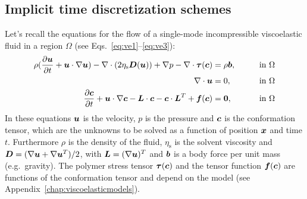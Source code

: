 \subsection{Implicit time discretization schemes}
\label{sec:implicitschemes}

Let's recall the equations for the flow of a single-mode incompressible viscoelastic fluid
in a region $\Omega$ (see Eqs.~\eqref{eq:ve1}--\eqref{eq:ve3}):
\begin{alignat}{2}
  \rho(\dfrac{\partial \boldsymbol{u}}{\partial t}+\boldsymbol{u}\cdot\nabla\boldsymbol{u})
      -\nabla\cdot(2\eta_\text{s}\boldsymbol{D}(\boldsymbol{u}))+\nabla p-\nabla\cdot\boldsymbol{\tau}(\boldsymbol{c})
        &=\rho\boldsymbol{b},\qquad&&\text{in }\Omega\label{eq:impve1}\\
\nabla\cdot\boldsymbol{u}&=0,\qquad&&\text{in }\Omega\\
        \dfrac{\partial \boldsymbol{c}}{\partial t}
+\boldsymbol{u}\cdot\nabla\boldsymbol{c}-\boldsymbol{L}\cdot\boldsymbol{c}-\boldsymbol{c}\cdot\boldsymbol{L}^T
 +\boldsymbol{f}(\boldsymbol{c})&=\boldsymbol{0},\qquad&&\text{in }\Omega\label{eq:impve3}
\end{alignat}
 In these equations $\boldsymbol{u}$ is the velocity, $p$ is the
pressure and $\boldsymbol{c}$ is the conformation tensor, which are the unknowns to be
solved as a function of position $\boldsymbol{x}$ and time $t$. Furthermore $\rho$ is
the density of the fluid, $\eta_\text{s}$ is the solvent viscosity and
 $\boldsymbol{D}=(\nabla\boldsymbol{u}+\nabla\boldsymbol{u}^T)/2$, with $\boldsymbol{L}=(\nabla\boldsymbol{u})^T$ and
$\boldsymbol{b}$ is a body force per unit mass (e.g.\ gravity).
The polymer stress tensor $\boldsymbol{\tau}(\boldsymbol{c})$ and the tensor function 
$\boldsymbol{f}(\boldsymbol{c})$ are 
functions of the conformation tensor and depend on the model (see
Appendix~\ref{chap:viscoelasticmodels}).

